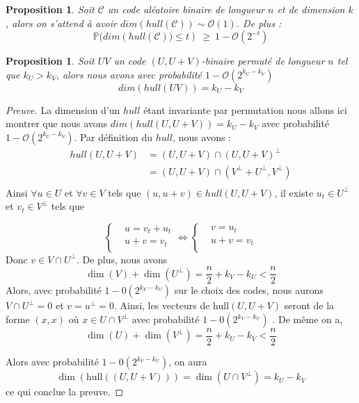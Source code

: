 \documentclass[12pt]{article}
\theoremstyle{plain}
\newtheorem{propo}[thm]{Proposition}
\theoremstyle{definition}
\begin{document}
\begin{propo}\label{dim_hull}
Soit $\mathcal{C}$ un code aléatoire binaire de longueur $n$ et de dimension $k$, alors on s'attend à avoir $dim(hull(\mathcal{C}))\sim\mathcal{O}(1)$. De plus : $$ \mathbb{P}\big(dim(hull(\mathcal{C})\big) \leq t) \ \geq\ 1 - \mathcal{O}(2^{-t}) $$
\end{propo}

\begin{propo}\label{dim_hull_UV}
Soit $UV$ un code $(U,U+V)$-binaire permuté de longueur $n$ tel que $k_U > k_V$, alors nous avons avec probabilité $1-\mathcal{O}(2^{k_U-k_V})$
$$ dim(hull(UV)) = k_U - k_V $$
\end{propo}



\begin{proof}[Preuve]
La dimension d'un $hull$ étant invariante par permutation nous allons ici montrer que nous avons $dim(hull(U,U+V)) = k_U - k_V$ avec probabilité $1-\mathcal{O}(2^{k_U-k_V})$.
Par définition du $hull$, nous avons :
\begin{equation*}
\begin{split}
hull(U,U+V) &= (U,U+V) \cap (U,U+V)^{\bot } \\
&= (U,U+V) \cap (V^{\bot}+U^{\bot}, V^{\bot}) \\
\end{split}
\end{equation*} 
Ainsi $\forall u\in U$ et $\forall v\in V$ tels que $(u,u+v)\in hull(U,U+V)$, il existe $u_t\in U^{\bot}$ et $v_t\in V^{\bot}$ tels que

\begin{equation*}
\left\{
\begin{aligned}
&u = v_t + u_t\\
&u + v = v_t\\
\end{aligned}
\right.
\iff
\left\{
\begin{aligned}
&v = u_t\\
&u + v = v_t\\
\end{aligned}
\right.
\end{equation*}
Donc $v\in V\cap U^{\bot}$.
De plus, nous avons $$\dim(V) + \dim(U^{\bot}) = \frac{n}{2} +k_V - k_U < \frac{n}{2}$$
Alors, avec probabilité $1-0(2^{k_V-k_U})$ sur le choix des codes, nous aurons $V \cap U^{\bot} = {0}$ et $v=u^{\bot} = 0$. Ainsi, les vecteurs de hull$(U,U+V)$ seront de la forme $(x,x)$ où $x \in U \cap V^{\bot}$ avec probabilité  $1-0(2^{k_V-k_U})$ .
De même on a,
$$\dim(U) + \dim(V^{\bot}) = \frac{n}{2} +k_U - k_V < \frac{n}{2}$$

\noindent Alors avec probabilité $1-0(2^{k_V-k_U})$, on aura 
$$\dim(\text{hull}((U,U+V))) = \dim(U\cap V^{\bot}) = k_U-k_V $$
ce qui conclue la preuve.
\end{proof}
\end{document}
